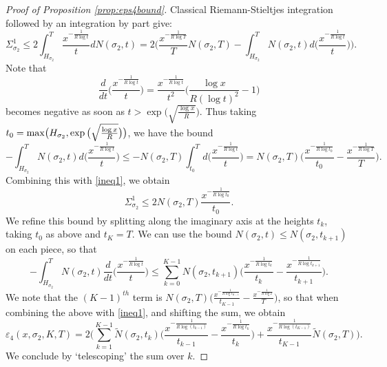 \documentclass[10pt]{amsart}
\newcommand{\s}{\sigma}
\theoremstyle{definition}
\numberwithin{equation}{section}
\begin{document}
%
\begin{proof}[Proof of Proposition \ref{prop:eps4bound}]
Classical Riemann-Stieltjes integration followed by an integration by part give:
\begin{equation}\label{ineq1}
\Sigma_{\sigma_2}^{1}  \le 2 \int_{H_{\sigma_2}}^T  \frac{x^{-\frac{1}{R\log t }}}{t} dN(\sigma_2,t)
= 2\Big( \frac{x^{-\frac{1}{R\log T }}}{T}  N(\sigma_2,T) - \int_{H_{\sigma_2}}^T N(\sigma_2,t) {d}\Big( \frac{x^{-\frac{1}{R\log t}}}{t} \Big) \Big).
 \end{equation}
Note that
\[  \frac{d}{dt}\Big( \frac{x^{-\frac{1}{R\log t }}}{t} \Big) = \frac{x^{-\frac{1}{R\log t }}}{t^2} \Big(\frac{\log x}{R(\log t)^2} -1 \Big)  \]
becomes negative as soon as $t> \exp\big( \sqrt{\frac{ \log x}R} \big) $.
Thus taking $t_0={\rm max} \big( H_{\sigma_2}, \exp\big( \sqrt{\frac{ \log x}R} \big) \big)$, we have the bound 
\[
 - \int_{H_{\sigma_2}}^T N(\sigma_2,t) {d}\Big( \frac{x^{-\frac{1}{R\log t}}}{t} \Big) 
 \le - N(\sigma_2,T)   \int_{t_0}^T {d}\Big( \frac{x^{-\frac{1}{R\log t }}}{t} \Big)
 =  N(\sigma_2,T)  \Big( \frac{x^{-\frac{1}{R\log t_0 }}}{t_0} - \frac{x^{-\frac{1}{R\log T }}}{T}\Big) .
\]
Combining this with \eqref{ineq1}, we obtain
\[ 
\Sigma_{\sigma_2}^{1}   \le   2 N(\sigma_2,T)  \frac{x^{-\frac{1}{R\log t_0 }}}{t_0} .
\] 
We refine this bound by splitting along the imaginary axis at the heights $t_k$, taking $t_0$ as above and $t_K = T$.  
We can use the bound $N(\sigma_2,t) \le N(\sigma_2,t_{k+1})$ on each piece, so that
\[
- \int_{H_{\sigma_2}}^T N(\sigma_2,t) \frac{d}{dt}\Big( \frac{x^{-\frac{1}{R\log t}}}{t} \Big) 
\le \sum_{k=0}^{K-1} 
N(\sigma_2,t_{k+1}) \Big( \frac{x^{-\frac{1}{R\log t_k}}}{t_k} - \frac{x^{-\frac{1}{R\log t_{k+1}}}}{t_{k+1}} \Big) .
\]
We note that the $(K-1)^{th}$ term is $N(\sigma_2,T) \Big( \frac{x^{-\frac{1}{R\log t_{K-1}}}}{t_{K-1}} - \frac{x^{-\frac{1}{R\log T}}}{T} \Big)  $, so that when combining the above with \eqref{ineq1}, and shifting the sum, we obtain
\[
\varepsilon_4(x,\s_2,K,T)  =  2 \Big( \sum_{k = 1}^{K-1} \tilde{N}(\s_2, t_k)\Big(  \frac{x^{-\frac{1}{R\log(t_{k-1})}}}{t_{k-1}} - \frac{x^{-\frac{1}{R\log t_{k} }}}{t_k} \Big)+ \frac{x^{-\frac{1}{R\log(t_{K-1})}}}{t_{K-1}}\tilde{N}(\s_2, T) \Big).
\]
We conclude by `telescoping' the sum over $k$.
\end{proof}
%
\end{document}
